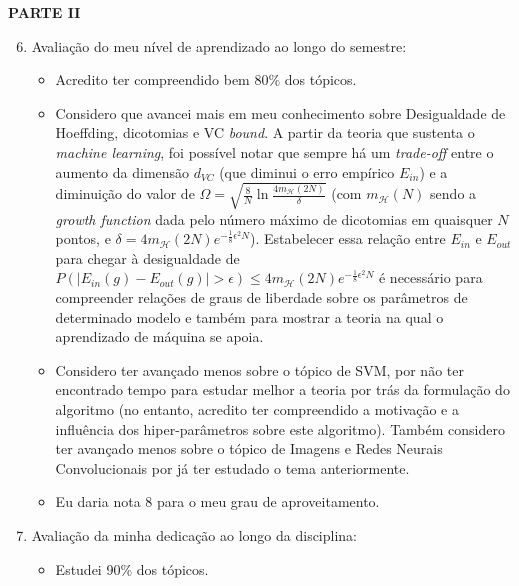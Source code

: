 \documentclass[a4paper,11pt]{article}
\begin{document}
    \textbf{PARTE II}
    \begin{enumerate}
        \setcounter{enumi}{5}

        \item Avaliação do meu nível de aprendizado ao longo do semestre:
            \begin{itemize}
                \item Acredito ter compreendido bem 80\% dos tópicos.
                
                \item Considero que avancei mais em meu conhecimento sobre Desigualdade de Hoeffding, dicotomias e VC \textit{bound}. A partir da teoria que sustenta o \textit{machine learning}, foi possível notar que sempre há um \textit{trade-off} entre o aumento da dimensão $d_{VC}$ (que diminui o erro empírico $E_{in}$) e a diminuição do valor de $\Omega = \sqrt{\frac{8}{N} \ln \frac{4 m_{\mathcal{H}}(2N)}{\delta}}$ (com $m_{\mathcal{H}}(N)$ sendo a \textit{growth function} dada pelo número máximo de dicotomias em quaisquer $N$ pontos, e $\delta = 4 m_{\mathcal{H}}(2N) e^{-\frac{1}{8} \epsilon^2 N}$). Estabelecer essa relação entre $E_{in}$ e $E_{out}$ para chegar à desigualdade de $P(|E_{in}(g) - E_{out}(g)|> \epsilon) \leq 4 m_{\mathcal{H}}(2N) e^{-\frac{1}{8} \epsilon^2N}$ é necessário para compreender relações de graus de liberdade sobre os parâmetros de determinado modelo e também para mostrar a teoria na qual o aprendizado de máquina se apoia.
                
                \item Considero ter avançado menos sobre o tópico de SVM, por não ter encontrado tempo para estudar melhor a teoria por trás da formulação do algoritmo (no entanto, acredito ter compreendido a motivação e a influência dos hiper-parâmetros sobre este algoritmo). Também considero ter avançado menos sobre o tópico de Imagens e Redes Neurais Convolucionais por já ter estudado o tema anteriormente.
                
                \item Eu daria nota 8 para o meu grau de aproveitamento.
            \end{itemize}

        \item Avaliação da minha dedicação ao longo da disciplina:
            \begin{itemize}
                \item Estudei 90\% dos tópicos.
                

\end{itemize}
\end{enumerate}
\end{document}

